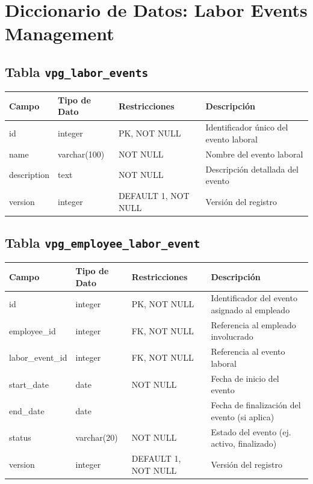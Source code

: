 \section{Diccionario de Datos: Labor Events Management}
\begin{center}

	\subsection{Tabla \texttt{vpg\_labor\_events}}
	\small
	\begin{tabular}{|l|l|l|p{6cm}|}
		\hline
		\textbf{Campo} & \textbf{Tipo de Dato} & \textbf{Restricciones} & \textbf{Descripción}                   \\
		\hline
		id             & integer               & PK, NOT NULL           & Identificador único del evento laboral \\
		name           & varchar(100)          & NOT NULL               & Nombre del evento laboral              \\
		description    & text                  & NOT NULL               & Descripción detallada del evento       \\
		version        & integer               & DEFAULT 1, NOT NULL    & Versión del registro                   \\
		\hline
	\end{tabular}
	\normalsize

	\subsection{Tabla \texttt{vpg\_employee\_labor\_event}}
	\small
	\begin{tabular}{|l|l|l|p{6cm}|}
		\hline
		\textbf{Campo}   & \textbf{Tipo de Dato} & \textbf{Restricciones} & \textbf{Descripción}                          \\
		\hline
		id               & integer               & PK, NOT NULL           & Identificador del evento asignado al empleado \\
		employee\_id     & integer               & FK, NOT NULL           & Referencia al empleado involucrado            \\
		labor\_event\_id & integer               & FK, NOT NULL           & Referencia al evento laboral                  \\
		start\_date      & date                  & NOT NULL               & Fecha de inicio del evento                    \\
		end\_date        & date                  &                        & Fecha de finalización del evento (si aplica)  \\
		status           & varchar(20)           & NOT NULL               & Estado del evento (ej. activo, finalizado)    \\
		version          & integer               & DEFAULT 1, NOT NULL    & Versión del registro                          \\
		\hline
	\end{tabular}
	\normalsize
\end{center}
